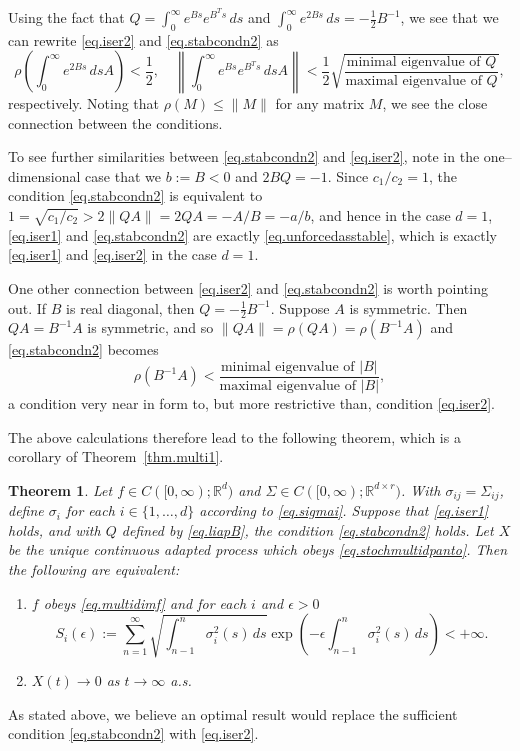\documentclass[a4paper,10pt,reqno]{amsart}
\numberwithin{equation}{section}
\newtheorem{theorem}{Theorem}
\theoremstyle{definition}
\theoremstyle{remark}
\DeclareMathOperator{\1}{\mathbbm 1}
\begin{document}
Using the fact that $Q=\int_0^\infty e^{Bs}e^{B^Ts}\,ds$ and $\int_0^\infty e^{2Bs}\,ds = -\frac{1}{2}B^{-1}$, we see that we can rewrite \eqref{eq.iser2} and \eqref{eq.stabcondn2} as 
\[
\rho\left(\int_0^\infty e^{2Bs}\,ds A \right)<\frac{1}{2},
\quad
\left\|\int_0^\infty e^{Bs} e^{B^Ts}\,ds A\right\|<\frac{1}{2}\sqrt{\frac{\text{minimal eigenvalue of $Q$}}{\text{maximal eigenvalue of $Q$}}},
\]
respectively. Noting that $\rho(M)\leq \|M\|$ for any matrix $M$, we see the close connection between the conditions.

To see further similarities between \eqref{eq.stabcondn2} and \eqref{eq.iser2}, note in the one--dimensional case that we $b:=B<0$ and $2BQ=-1$. Since $c_1/c_2=1$, the condition \eqref{eq.stabcondn2} is equivalent to  $1=\sqrt{c_1/c_2}>2\|QA\|=2QA=-A/B=-a/b$, and hence in the case $d=1$, \eqref{eq.iser1} and \eqref{eq.stabcondn2} are exactly \eqref{eq.unforcedasstable}, which is exactly \eqref{eq.iser1} and \eqref{eq.iser2} in the case $d=1$. 

One other connection between \eqref{eq.iser2} and \eqref{eq.stabcondn2} is worth pointing out. If $B$ is real diagonal, then $Q=-\frac{1}{2}B^{-1}$. Suppose $A$ is symmetric. Then $QA=B^{-1}A$ is symmetric, and so $\|QA\|=\rho(QA)=\rho(B^{-1}A)$ and \eqref{eq.stabcondn2} becomes 
\[
\rho(B^{-1}A) < \frac{\text{minimal eigenvalue of $|B|$}}{\text{maximal eigenvalue of $|B|$}},
\]
a condition very near in form to,  but more restrictive than, condition \eqref{eq.iser2}.

The above calculations therefore lead to the following theorem, which is a corollary of Theorem~\ref{thm.multi1}.
\begin{theorem}  \label{thm.multi2}
Let $f\in C([0,\infty);\mathbb{R}^d)$ and $\Sigma\in C([0,\infty);\mathbb{R}^{d\times r})$. With $\sigma_{ij}=\Sigma_{ij}$,  define $\sigma_i$ for each $i\in \{1,\ldots,d\}$ according to \eqref{eq.sigmai}. 
Suppose that \eqref{eq.iser1} holds, and with $Q$ defined by \eqref{eq.liapB}, the condition \eqref{eq.stabcondn2} holds. 
Let $X$ be the unique continuous adapted process which obeys \eqref{eq.stochmultidpanto}.
Then the following are equivalent:
\begin{enumerate}
	\item[(A)] $f$ obeys \eqref{eq.multidimf} and for each $i$ and $\epsilon>0$ 	\begin{equation} \label{eq.Si}
		S_i(\epsilon):= \sum_{n=1}^\infty \sqrt{\int_{n-1}^n\sigma_i^2(s)\,ds} \exp\left(-\epsilon\int_{n-1}^{n}\sigma_i^2(s)\,ds\right)<+\infty.
	\end{equation}
	\item[(B)] $X(t)\to 0$ as $t\to\infty$ a.s.
\end{enumerate}
\end{theorem} 
As stated above, we believe an optimal result would replace the sufficient condition \eqref{eq.stabcondn2} with \eqref{eq.iser2}. 
\end{document}
